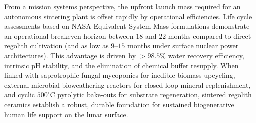 From a mission systems perspective, the upfront launch mass required for an autonomous sintering plant is offset rapidly by operational efficiencies\cite{ming1989lunar,hanford2004advanced,metzger2023cost}. Life cycle assessments based on NASA Equivalent System Mass formulations demonstrate an operational breakeven horizon between $18$ and $22$ months compared to direct regolith cultivation (and as low as $9\text{--}15$ months under surface nuclear power architectures)\cite{ming1989lunar,chinnannan2025spirulina,colozza2020power}. This advantage is driven by $>98.5\%$ water recovery efficiency, intrinsic $\mathrm{pH}$ stability, and the elimination of chemical buffer resupply\cite{ming1989lunar,anderson2021lunar}. When linked with saprotrophic fungal mycoponics for inedible biomass upcycling, external microbial bioweathering reactors for closed-loop mineral replenishment, and cyclic $500^\circ\mathrm{C}$ pyrolytic bake-outs for substrate regeneration, sintered regolith ceramics establish a robust, durable foundation for sustained biogenerative human life support on the lunar surface\cite{ming1989lunar,grimm2018mushroom,verseux2022editorial,cockell2018biorock,barta1994thermal}.
